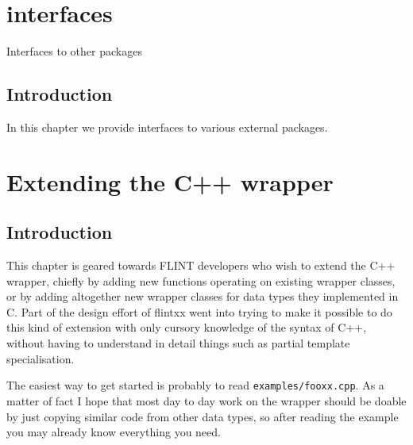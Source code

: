 \documentclass[a4paper,10pt]{book}
\newcommand{\code}{\lstinline}
\begin{document}
{{


\chapter{interfaces}
\epigraph{Interfaces to other packages}{}

\section{Introduction}

In this chapter we provide interfaces to various external packages.



\appendix
\chapter{Extending the C++ wrapper}
\label{app:genericxx}

\section{Introduction}

This chapter is geared towards FLINT developers who wish to extend the C++
wrapper, chiefly by adding new functions operating on existing wrapper classes,
or by adding altogether new wrapper classes for data types they implemented in
C. Part of the design effort of flintxx went into trying to make it possible to
do this kind of extension with only cursory knowledge of the syntax of C++,
without having to understand in detail things such as partial template
specialisation.

The easiest way to get started is probably to read \code{examples/fooxx.cpp}.
As a matter of fact I hope that most day to day work on the wrapper should be
doable by just copying similar code from other data types, so after reading the
example you may already know everything you need.

}}
\end{document}
